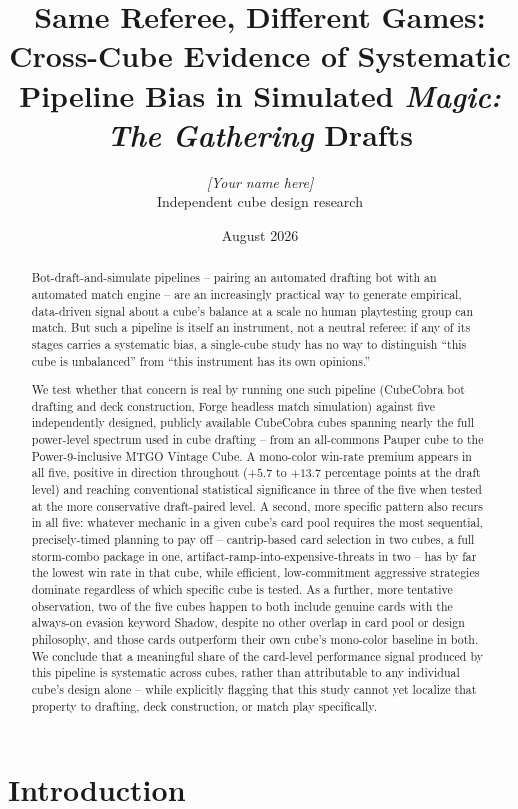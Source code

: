 \documentclass[11pt]{article}
\title{Same Referee, Different Games: Cross-Cube Evidence of Systematic\\
Pipeline Bias in Simulated \emph{Magic: The Gathering} Drafts}
\author{
  \textit{[Your name here]} \\
  \small Independent cube design research
}
\date{August 2026}
\begin{document}
\maketitle

\begin{abstract}
Bot-draft-and-simulate pipelines -- pairing an automated drafting bot with an
automated match engine -- are an increasingly practical way to generate
empirical, data-driven signal about a cube's balance at a scale no human
playtesting group can match. But such a pipeline is itself an instrument, not a
neutral referee: if any of its stages carries a systematic bias, a single-cube
study has no way to distinguish ``this cube is unbalanced'' from ``this
instrument has its own opinions.''

We test whether that concern is real by running one such pipeline (CubeCobra bot
drafting and deck construction, Forge headless match simulation) against five
independently designed, publicly available CubeCobra cubes spanning nearly the
full power-level spectrum used in cube drafting -- from an all-commons Pauper
cube to the Power-9-inclusive MTGO Vintage Cube. A mono-color win-rate premium
appears in all five, positive in direction throughout ($+5.7$ to $+13.7$
percentage points at the draft level) and reaching conventional statistical
significance in three of the five when tested at the more conservative
draft-paired level. A second, more specific
pattern also recurs in all five: whatever mechanic in a given cube's card pool
requires the most sequential, precisely-timed planning to pay off -- cantrip-based
card selection in two cubes, a full storm-combo package in one,
artifact-ramp-into-expensive-threats in two -- has by far the lowest win rate in
that cube, while efficient, low-commitment aggressive strategies dominate
regardless of which specific cube is tested. As a further, more tentative
observation, two of the five cubes happen to both include genuine cards with the
always-on evasion keyword Shadow, despite no other overlap in card pool or
design philosophy, and those cards outperform their own cube's mono-color
baseline in both. We conclude that a meaningful share of the card-level
performance signal produced by this pipeline is systematic across cubes, rather
than attributable to any individual cube's design alone -- while explicitly
flagging that this study cannot yet localize
that property to drafting, deck construction, or match play specifically.
\end{abstract}

\section{Introduction}
\end{document}
